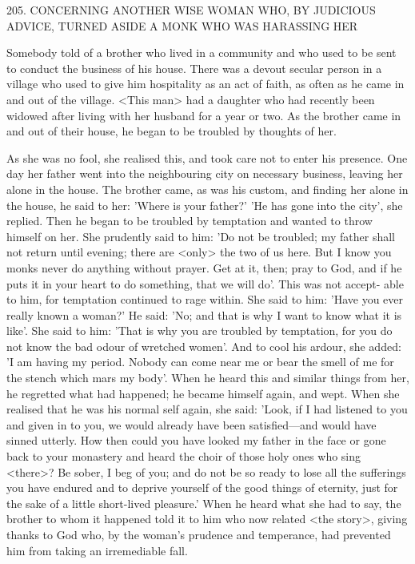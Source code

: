 205.
CONCERNING ANOTHER WISE WOMAN
WHO, BY JUDICIOUS ADVICE,
TURNED ASIDE A MONK WHO WAS HARASSING HER

Somebody told of a brother who lived in a community and who
used to be sent to conduct the business of his house.
There was a
devout secular person in a village who used to give him hospitality
as an act of faith, as often as he came in and out of the village.
<This man> had a daughter who had recently been widowed after
living with her husband for a year or two.
As the brother came in
and out of their house, he began to be troubled by thoughts of her.

As she was no fool, she realised this, and took care not to enter his
presence.
One day her father went into the neighbouring city on
necessary business, leaving her alone in the house.
The brother
came, as was his custom, and finding her alone in the house, he said
to her: 'Where is your father?' 'He has gone into the city', she
replied.
Then he began to be troubled by temptation and wanted to
throw himself on her.
She prudently said to him: 'Do not be
troubled; my father shall not return until evening; there are <only>
the two of us here.
But I know you monks never do anything
without prayer.
Get at it, then; pray to God, and if he puts it in
your heart to do something, that we will do'.
This was not accept-
able to him, for temptation continued to rage within.
She said to
him: 'Have you ever really known a woman?' He said: 'No; and that
is why I want to know what it is like'.
She said to him: 'That is why
you are troubled by temptation, for you do not know the bad odour
of wretched women'.
And to cool his ardour, she added: 'I am
having my period.
Nobody can come near me or bear the smell of
me for the stench which mars my body'.
When he heard this and
similar things from her, he regretted what had happened; he became
himself again, and wept.
When she realised that he was his normal
self again, she said: 'Look, if I had listened to you and given in to
you, we would already have been satisfied—and would have sinned
utterly.
How then could you have looked my father in the face or
gone back to your monastery and heard the choir of those holy ones
who sing <there>? Be sober, I beg of you; and do not be so ready
to lose all the sufferings you have endured and to deprive yourself
of the good things of eternity, just for the sake of a little short-lived
pleasure.' When he heard what she had to say, the brother to whom
it happened told it to him who now related <the story>, giving
thanks to God who, by the woman's prudence and temperance, had
prevented him from taking an irremediable fall.

